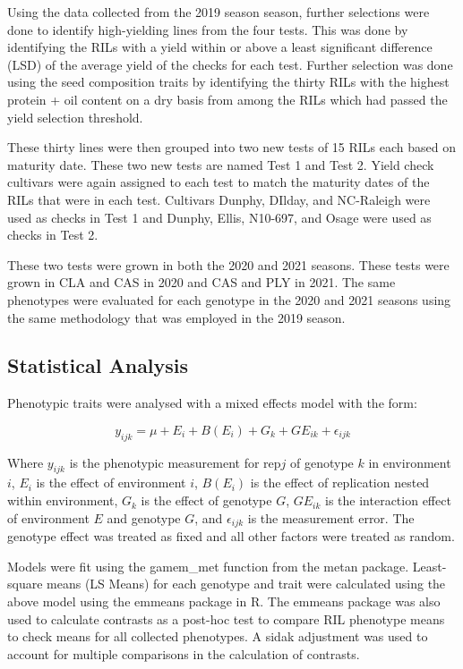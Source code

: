 \documentclass[Agronomy,article,submit,moreauthors,pdftex]{mdpi}
\begin{document}
Using the data collected from the 2019 season season, further selections
were done to identify high-yielding lines from the four tests. This was
done by identifying the RILs with a yield within or above a least
significant difference (LSD) of the average yield of the checks for each
test. Further selection was done using the seed composition traits by
identifying the thirty RILs with the highest protein + oil content on a
dry basis from among the RILs which had passed the yield selection
threshold.

These thirty lines were then grouped into two new tests of 15 RILs each
based on maturity date. These two new tests are named Test 1 and Test 2.
Yield check cultivars were again assigned to each test to match the
maturity dates of the RILs that were in each test. Cultivars Dunphy,
DIlday, and NC-Raleigh were used as checks in Test 1 and Dunphy, Ellis,
N10-697, and Osage were used as checks in Test 2.

These two tests were grown in both the 2020 and 2021 seasons. These
tests were grown in CLA and CAS in 2020 and CAS and PLY in 2021. The
same phenotypes were evaluated for each genotype in the 2020 and 2021
seasons using the same methodology that was employed in the 2019 season.

\hypertarget{statistical-analysis}{%
\subsection{Statistical Analysis}\label{statistical-analysis}}

Phenotypic traits were analysed with a mixed effects model with the
form:

\[y_{ijk} = \mu + E_i + B(E_i) + G_k + GE_{ik} + \epsilon_{ijk}\]

Where \(y_{ijk}\) is the phenotypic measurement for rep\(j\) of genotype
\(k\) in environment \(i\), \(E_i\) is the effect of environment \(i\),
\(B(E_i)\) is the effect of replication nested within environment,
\(G_k\) is the effect of genotype \(G\), \(GE_{ik}\) is the interaction
effect of environment \(E\) and genotype \(G\), and \(\epsilon_{ijk}\)
is the measurement error. The genotype effect was treated as fixed and
all other factors were treated as random.

Models were fit using the gamem\_met function from the metan
package\citep{olivotoMetanPackageMultienvironment2020}. Least-square
means (LS Means) for each genotype and trait were calculated using the
above model using the emmeans
package\citep{lenthEmmeansEstimatedMarginal2022} in R. The emmeans
package was also used to calculate contrasts as a post-hoc test to
compare RIL phenotype means to check means for all collected phenotypes.
A sidak adjustment was used to account for multiple comparisons in the
calculation of contrasts.
\end{document}
